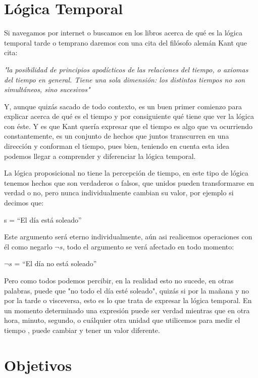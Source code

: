 \section{Lógica Temporal}

Si navegamos por internet o buscamos en los libros acerca de qué es la lógica temporal tarde o temprano daremos con una cita del filósofo alemán Kant que cita: 

\begin{center}
\textit{"la posibilidad de principios apodícticos de las relaciones del tiempo, o axiomas del tiempo en general. Tiene una sola dimensión: los distintos tiempos no son simultáneos, sino sucesivos"}
\end{center}

Y, aunque quizás sacado de todo contexto, es un buen primer comienzo para explicar acerca de qué es el tiempo y por consiguiente qué tiene que ver la lógica con éste. Y es que Kant quería expresar que el tiempo es algo que va ocurriendo constantemente, es un conjunto de hechos que juntos transcurren en una dirección y conforman el tiempo, pues bien, teniendo en cuenta esta idea podemos llegar a comprender y diferenciar la lógica temporal. 

La lógica proposicional no tiene la percepción de tiempo, en este tipo de lógica tenemos hechos que son verdaderos o falsos, que unidos pueden transformarse en verdad o no, pero nunca individualmente cambian su valor, por ejemplo si decimos que:

\begin{center}
s = ``El día está soleado''
\end{center}

Este argumento será eterno individualmente, aún asi realicemos operaciones con él como negarlo $\neg{s}$, todo el argumento se verá afectado en todo momento:

\begin{center}
$\neg{s}$ = ``El día no está soleado''
\end{center}

Pero como todos podemos percibir, en la realidad esto no sucede, en otras palabras, puede que "no todo el día esté soleado", quizás si por la mañana y no por la tarde o visceversa, esto es lo que trata de expresar la lógica temporal. En un momento determinado una expresión puede ser verdad mientras que en otra hora, minuto, segundo, o cuálquier otra unidad que utilicemos para medir el tiempo , puede cambiar y tener un valor diferente. 

\section{Objetivos}

